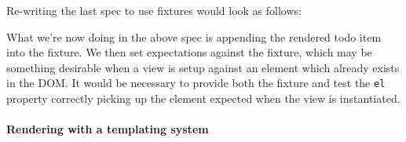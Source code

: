 \documentclass[9pt]{book}
\newenvironment{Shaded}{}{}
\newcommand{\KeywordTok}[1]{\textcolor[rgb]{0.00,0.44,0.13}{\textbf{{#1}}}}
\newcommand{\StringTok}[1]{\textcolor[rgb]{0.25,0.44,0.63}{{#1}}}
\newcommand{\OtherTok}[1]{\textcolor[rgb]{0.00,0.44,0.13}{{#1}}}
\newcommand{\FunctionTok}[1]{\textcolor[rgb]{0.02,0.16,0.49}{{#1}}}
\newcommand{\NormalTok}[1]{{#1}}
\begin{document}
Re-writing the last spec to use fixtures would look as follows:

\begin{Shaded}
\end{Shaded}

What we're now doing in the above spec is appending the rendered todo
item into the fixture. We then set expectations against the fixture,
which may be something desirable when a view is setup against an element
which already exists in the DOM. It would be necessary to provide both
the fixture and test the \texttt{el} property correctly picking up the
element expected when the view is instantiated.

\paragraph{Rendering with a templating
system}\label{rendering-with-a-templating-system}
\end{document}
